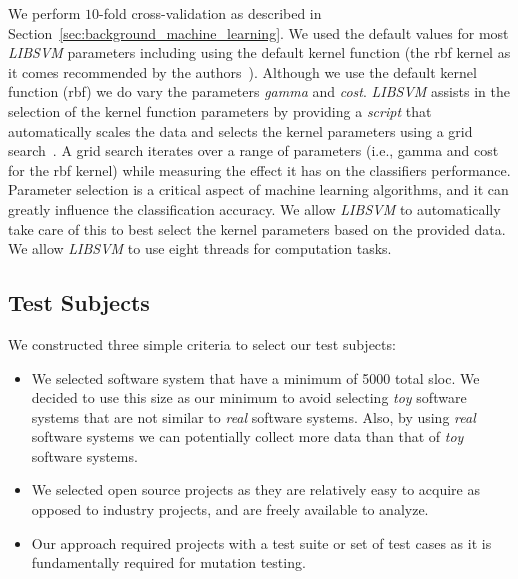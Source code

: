 We perform $10$-fold cross-validation as described in Section~\ref{sec:background_machine_learning}. We used the default values for most \emph{LIBSVM} parameters including using the default kernel function (the \gls{rbf} kernel as it comes recommended by the authors~\cite{HCL03}). Although we use the default kernel function (\gls{rbf}) we do vary the parameters \emph{gamma} and \emph{cost}. \emph{LIBSVM} assists in the selection of the kernel function parameters by providing a \emph{script} that automatically scales the data and selects the kernel parameters using a grid search~\cite{HCL03}. A grid search iterates over a range of parameters (i.e., gamma and cost for the \gls{rbf} kernel) while measuring the effect it has on the classifiers performance. Parameter selection is a critical aspect of machine learning algorithms, and it can greatly influence the classification accuracy. We allow \emph{LIBSVM} to automatically take care of this to best select the kernel parameters based on the provided data. We allow \emph{LIBSVM} to use eight threads for computation tasks.

\subsection{Test Subjects}
\label{subsec:experiment_test_subjects}
We constructed three simple criteria to select our test subjects:

\begin{itemize}
  \item We selected software system that have a minimum of 5000 total \gls{sloc}. We decided to use this size as our minimum to avoid selecting \emph{toy} software systems that are not similar to \emph{real} software systems. Also, by using \emph{real} software systems we can potentially collect more data than that of \emph{toy} software systems.
  \item We selected open source projects as they are relatively easy to acquire as opposed to industry projects, and are freely available to analyze.
  \item Our approach required projects with a test suite or set of test cases as it is fundamentally required for mutation testing.
\end{itemize}

